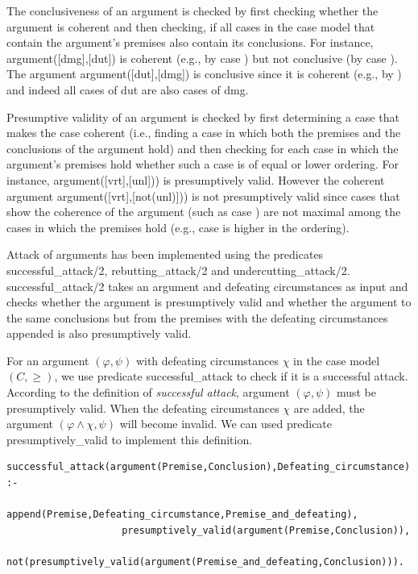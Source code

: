 \documentclass{IOS-Book-Article}
\begin{document}
The conclusiveness of an argument is checked by first checking whether the argument is coherent and then checking, if all cases in the case model that contain the argument's premises also contain its conclusions. For instance, {\mf argument([dmg],[dut])} is coherent (e.g., by case {}) but not conclusive (by case {}). The argument {\mf argument([dut],[dmg])} is conclusive since it is coherent (e.g., by {}) and indeed all cases of {\mf dut} are also cases of {\mf dmg}.

Presumptive validity of an argument is checked by first determining a case that makes the case coherent (i.e., finding a case in which both the premises and the conclusions of the argument hold) and then checking for each case in which the argument's premises hold whether such a case is of equal or lower ordering. For instance, {\mf argument([vrt],[unl]))} is presumptively valid. However the coherent argument {\mf argument([vrt],[not(unl)]))} is not presumptively valid since cases that show the coherence of the argument (such as case {}) are not maximal among the cases in which the premises hold (e.g., case {} is higher in the ordering).

Attack of arguments has been implemented using the predicates {\mf successful\_attack/2}, {\mf rebutting\_attack/2} and {\mf undercutting\_attack/2}. {\mf successful\_attack/2} takes an argument and defeating circumstances as input and checks whether the argument is presumptively valid and whether the argument to the same conclusions but from the premises with the defeating circumstances appended is also presumptively valid.




For an argument $(\varphi, \psi)$ with defeating circumstances $\chi$ in the case model $(C, \geq)$, we use predicate {\mf successful\_attack} to check if it is a successful attack. According to the definition of \textit{successful attack}, argument $(\varphi, \psi)$ must be presumptively valid. When the defeating circumstances $\chi$ are added, the argument $(\varphi \wedge \chi, \psi)$ will become invalid. We can used predicate {\mf presumptively\_valid} to implement this definition.
\begin{lstlisting}
successful_attack(argument(Premise,Conclusion),Defeating_circumstance) :-
					append(Premise,Defeating_circumstance,Premise_and_defeating),
					presumptively_valid(argument(Premise,Conclusion)),
					not(presumptively_valid(argument(Premise_and_defeating,Conclusion))).
\end{lstlisting}
\end{document}
